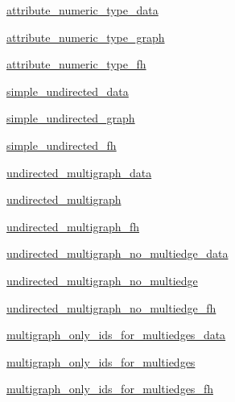\begin{DoxyCompactItemize}
\item 
\hyperlink{classnetworkx_1_1readwrite_1_1tests_1_1test__graphml_1_1BaseGraphML_a634bd79e1d3d9dd2bb70c6422b1bbd66}{attribute\+\_\+numeric\+\_\+type\+\_\+data}
\item 
\hyperlink{classnetworkx_1_1readwrite_1_1tests_1_1test__graphml_1_1BaseGraphML_a002a5a28928202d2dff5abeaf049815d}{attribute\+\_\+numeric\+\_\+type\+\_\+graph}
\item 
\hyperlink{classnetworkx_1_1readwrite_1_1tests_1_1test__graphml_1_1BaseGraphML_aeda8ab60605e8f7859334af9903136a0}{attribute\+\_\+numeric\+\_\+type\+\_\+fh}
\item 
\hyperlink{classnetworkx_1_1readwrite_1_1tests_1_1test__graphml_1_1BaseGraphML_a8bf87c275ec5d376e31488a4f2a6d946}{simple\+\_\+undirected\+\_\+data}
\item 
\hyperlink{classnetworkx_1_1readwrite_1_1tests_1_1test__graphml_1_1BaseGraphML_a06e6244efb577c3245fd3d4dde813fa6}{simple\+\_\+undirected\+\_\+graph}
\item 
\hyperlink{classnetworkx_1_1readwrite_1_1tests_1_1test__graphml_1_1BaseGraphML_a87343e649ce5651f682c99213b647eea}{simple\+\_\+undirected\+\_\+fh}
\item 
\hyperlink{classnetworkx_1_1readwrite_1_1tests_1_1test__graphml_1_1BaseGraphML_ae983c3f39150aaea583e81cfbcd8e6ca}{undirected\+\_\+multigraph\+\_\+data}
\item 
\hyperlink{classnetworkx_1_1readwrite_1_1tests_1_1test__graphml_1_1BaseGraphML_a6011f4ca8f41bd7e6917a25dd0d4e837}{undirected\+\_\+multigraph}
\item 
\hyperlink{classnetworkx_1_1readwrite_1_1tests_1_1test__graphml_1_1BaseGraphML_ae67c1e0ef1f95242e3ca4525007dbcbe}{undirected\+\_\+multigraph\+\_\+fh}
\item 
\hyperlink{classnetworkx_1_1readwrite_1_1tests_1_1test__graphml_1_1BaseGraphML_a69678cf52ee3c47823f878fa02c4e425}{undirected\+\_\+multigraph\+\_\+no\+\_\+multiedge\+\_\+data}
\item 
\hyperlink{classnetworkx_1_1readwrite_1_1tests_1_1test__graphml_1_1BaseGraphML_a9d222811b6c550aca067de2e1b9668ee}{undirected\+\_\+multigraph\+\_\+no\+\_\+multiedge}
\item 
\hyperlink{classnetworkx_1_1readwrite_1_1tests_1_1test__graphml_1_1BaseGraphML_a58419990bde905dd4a38e46ddcef359c}{undirected\+\_\+multigraph\+\_\+no\+\_\+multiedge\+\_\+fh}
\item 
\hyperlink{classnetworkx_1_1readwrite_1_1tests_1_1test__graphml_1_1BaseGraphML_a40b4c9f06b9375058a676c7028c06c3d}{multigraph\+\_\+only\+\_\+ids\+\_\+for\+\_\+multiedges\+\_\+data}
\item 
\hyperlink{classnetworkx_1_1readwrite_1_1tests_1_1test__graphml_1_1BaseGraphML_a99145650c2c8548dbd8647ceb404c6fd}{multigraph\+\_\+only\+\_\+ids\+\_\+for\+\_\+multiedges}
\item 
\hyperlink{classnetworkx_1_1readwrite_1_1tests_1_1test__graphml_1_1BaseGraphML_ae8fd454831325f6e4eac3fdf074e9597}{multigraph\+\_\+only\+\_\+ids\+\_\+for\+\_\+multiedges\+\_\+fh}
\end{DoxyCompactItemize}


